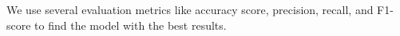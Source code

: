 \documentclass[a4paper,fleqn]{cas-sc}
\begin{document}
We use several evaluation metrics like accuracy score, precision, recall, and F1-score to find the model with the best results.






\end{document}

